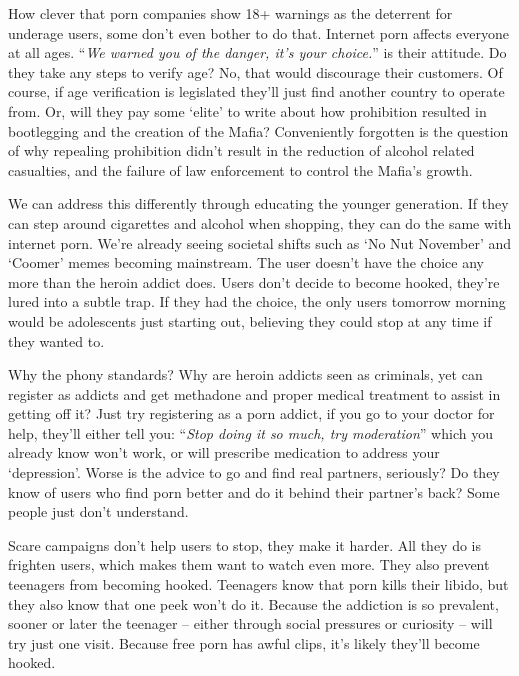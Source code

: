 \documentclass[
]{book}
\begin{document}
How clever that porn companies show 18+ warnings as the deterrent for underage users, some don't even bother to do that. Internet porn affects everyone at all ages. ``\emph{We warned you of the danger, it's your choice.}'' is their attitude. Do they take any steps to verify age? No, that would discourage their customers. Of course, if age verification is legislated they'll just find another country to operate from. Or, will they pay some `elite' to write about how prohibition resulted in bootlegging and the creation of the Mafia? Conveniently forgotten is the question of why repealing prohibition didn't result in the reduction of alcohol related casualties, and the failure of law enforcement to control the Mafia's growth.

We can address this differently through educating the younger generation. If they can step around cigarettes and alcohol when shopping, they can do the same with internet porn. We're already seeing societal shifts such as `No Nut November' and `Coomer' memes becoming mainstream. The user doesn't have the choice any more than the heroin addict does. Users don't decide to become hooked, they're lured into a subtle trap. If they had the choice, the only users tomorrow morning would be adolescents just starting out, believing they could stop at any time if they wanted to.

Why the phony standards? Why are heroin addicts seen as criminals, yet can register as addicts and get methadone and proper medical treatment to assist in getting off it? Just try registering as a porn addict, if you go to your doctor for help, they'll either tell you: ``\emph{Stop doing it so much, try moderation}'' which you already know won't work, or will prescribe medication to address your `depression'. Worse is the advice to go and find real partners, seriously? Do they know of users who find porn better and do it behind their partner's back? Some people just don't understand.

Scare campaigns don't help users to stop, they make it harder. All they do is frighten users, which makes them want to watch even more. They also prevent teenagers from becoming hooked. Teenagers know that porn kills their libido, but they also know that one peek won't do it. Because the addiction is so prevalent, sooner or later the teenager -- either through social pressures or curiosity -- will try just one visit. Because free porn has awful clips, it's likely they'll become hooked.
\end{document}
